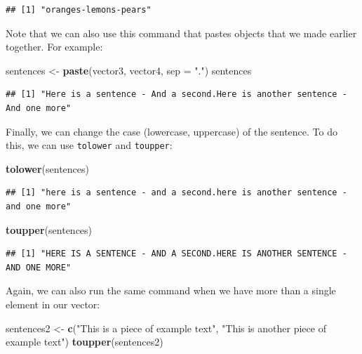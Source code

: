 \documentclass[
]{book}
\newenvironment{Shaded}{\begin{snugshade}}{\end{snugshade}}
\newcommand{\AttributeTok}[1]{\textcolor[rgb]{0.13,0.29,0.53}{#1}}
\newcommand{\FunctionTok}[1]{\textcolor[rgb]{0.13,0.29,0.53}{\textbf{#1}}}
\newcommand{\NormalTok}[1]{#1}
\newcommand{\OtherTok}[1]{\textcolor[rgb]{0.56,0.35,0.01}{#1}}
\newcommand{\StringTok}[1]{\textcolor[rgb]{0.31,0.60,0.02}{#1}}
\begin{document}
\begin{verbatim}
## [1] "oranges-lemons-pears"
\end{verbatim}

Note that we can also use this command that pastes objects that we made earlier together. For example:

\begin{Shaded}
\begin{Highlighting}[]
\NormalTok{sentences }\OtherTok{\textless{}{-}} \FunctionTok{paste}\NormalTok{(vector3, vector4, }\AttributeTok{sep =} \StringTok{"."}\NormalTok{)}
\NormalTok{sentences}
\end{Highlighting}
\end{Shaded}

\begin{verbatim}
## [1] "Here is a sentence - And a second.Here is another sentence - And one more"
\end{verbatim}

Finally, we can change the case (lowercase, uppercase) of the sentence. To do this, we can use \texttt{tolower} and \texttt{toupper}:

\begin{Shaded}
\begin{Highlighting}[]
\FunctionTok{tolower}\NormalTok{(sentences)}
\end{Highlighting}
\end{Shaded}

\begin{verbatim}
## [1] "here is a sentence - and a second.here is another sentence - and one more"
\end{verbatim}

\begin{Shaded}
\begin{Highlighting}[]
\FunctionTok{toupper}\NormalTok{(sentences)}
\end{Highlighting}
\end{Shaded}

\begin{verbatim}
## [1] "HERE IS A SENTENCE - AND A SECOND.HERE IS ANOTHER SENTENCE - AND ONE MORE"
\end{verbatim}

Again, we can also run the same command when we have more than a single element in our vector:

\begin{Shaded}
\begin{Highlighting}[]
\NormalTok{sentences2 }\OtherTok{\textless{}{-}} \FunctionTok{c}\NormalTok{(}\StringTok{"This is a piece of example text"}\NormalTok{, }\StringTok{"This is another piece of example text"}\NormalTok{)}
\FunctionTok{toupper}\NormalTok{(sentences2)}
\end{Highlighting}
\end{Shaded}
\end{document}
